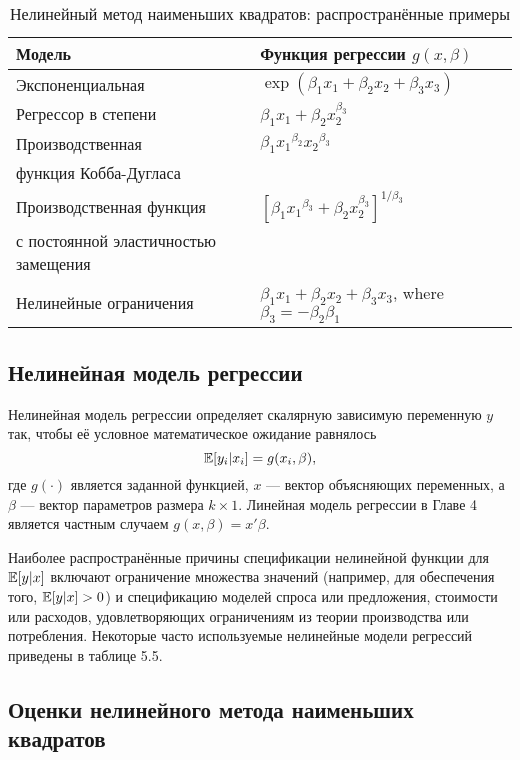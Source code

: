 \begin{table}[h]
\begin{center}
\caption{\label{tab:NLS} Нелинейный метод наименьших квадратов: распространённые примеры}
\begin{tabular}[t]{ll}
\hline
\hline
\bf{Модель} & \bf{Функция регрессии} $g(x,\beta)$ \\
\hline
Экспоненциальная & $\exp(\beta_1 x_1 + \beta_2 x_2 + \beta_3 x_3)$ \\
Регрессор в степени & $\beta_1 x_1 + \beta_2 x_2^{\beta_3}$ \\
Производственная & $\beta_1 {x_1}^{\beta_2} {x_2}^{\beta_3}$\\ 
функция Кобба-Дугласа & \\
Производственная функция & $[\beta_1 {x_1}^{\beta_3} + \beta_2 x_2^{\beta_3}]^{1/\beta_3}$\\
с постоянной эластичностью замещения & \\ 
Нелинейные ограничения & $\beta_1 x_1 + \beta_2 x_2 + \beta_3 x_3$, where $\beta_3=-\beta_2 \beta_1$ \\
\hline
\hline
\end{tabular}
\end{center}
\end{table}

\subsection{Нелинейная модель регрессии}

Нелинейная модель регрессии определяет скалярную зависимую переменную $y$ так, чтобы её условное математическое ожидание равнялось
\begin{equation}
\mathbb{E}[y_i|x_i]=g(x_i,\beta),
\end{equation}
где $g(\cdot)$ является заданной функцией, $x$ --- вектор объясняющих переменных, а $\beta$ --- вектор параметров размера $k \times 1$. Линейная модель регрессии в Главе 4 является частным случаем $g(x,\beta)=x'\beta$.

Наиболее распространённые причины спецификации нелинейной функции для $\mathbb{E}[y|x]$ включают ограничение множества значений (например, для обеспечения того, $\mathbb{E}[y|x]>0$) и спецификацию моделей спроса или предложения, стоимости или расходов, удовлетворяющих ограничениям из теории производства или потребления. Некоторые часто используемые нелинейные модели регрессий приведены в таблице 5.5.

\subsection{Оценки нелинейного метода наименьших квадратов}

